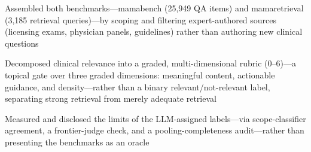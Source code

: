         \begin{onecolentry}
        \begin{highlights}
            \item Assembled both benchmarks---mamabench (25,949 QA items) and mamaretrieval (3,185 retrieval queries)---by scoping and filtering expert-authored sources (licensing exams, physician panels, guidelines) rather than authoring new clinical questions
            \item Decomposed clinical relevance into a graded, multi-dimensional rubric (0--6)---a topical gate over three graded dimensions: meaningful content, actionable guidance, and density---rather than a binary relevant/not-relevant label, separating strong retrieval from merely adequate retrieval
            \item Measured and disclosed the limits of the LLM-assigned labels---via scope-classifier agreement, a frontier-judge check, and a pooling-completeness audit---rather than presenting the benchmarks as an oracle
        \end{highlights}
        \end{onecolentry}
